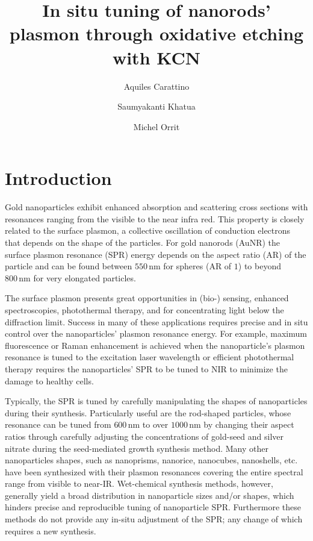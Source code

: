 \documentclass[a4paper,oneside,onecolumn]{article}
\title{In situ tuning of nanorods' plasmon through oxidative etching with KCN}
\author[1]{Aquiles Carattino}
\author[2]{Saumyakanti Khatua}
\author[1]{Michel Orrit}
\affil[1]{Leiden Institute of Physics, Leiden, The Netherlands}
\affil[2]{Indian Institute of Technology- Gandhinagar, Ahmedabad,  India}
\newcommand{\nm}{\ensuremath{\,\textrm{nm}}}
\begin{document}
\maketitle
{}

\section{Introduction}

Gold nanoparticles exhibit enhanced absorption and scattering cross sections
with resonances ranging from the visible to the near infra red. This property is
closely related to the surface plasmon, a collective oscillation of conduction
electrons that depends on the shape of the particles. For gold nanorods (AuNR)
the surface plasmon resonance (SPR) energy depends on the aspect ratio (AR) of
the particle and can be found between $550\nm$ for spheres (AR of $1$) to beyond
$800\nm$ for very elongated particles.

The surface plasmon presents great opportunities in (bio-)
sensing\cite{Zijlstra2012}, enhanced spectroscopies\cite{Sivapalan2013},
photothermal therapy\cite{Zhao2014}, and for concentrating light below the
diffraction limit\cite{Zijlstra2011}. Success in many of these applications
requires precise and in situ control over the nanoparticles' plasmon resonance
energy. For example, maximum fluorescence\cite{Khatua2014} or Raman
enhancement\cite{McFarland2005} is achieved when the nanoparticle's plasmon
resonance is tuned to the excitation laser wavelength or efficient photothermal
therapy requires the nanoparticles' SPR to be tuned to NIR to minimize the
damage to healthy cells\cite{Alkilany2012}.

Typically, the SPR is tuned by carefully manipulating the shapes of
nanoparticles during their synthesis. Particularly useful are the rod-shaped
particles, whose resonance can be tuned from $600\nm$ to over $1000\nm$ by
changing their aspect ratios through carefully adjusting the concentrations of
gold-seed and silver nitrate during the seed-mediated growth synthesis
method\cite{Vigderman2012}. Many other nanoparticles shapes, such as nanoprisms,
nanorice, nanocubes, nanoshells, etc. have been synthesized with their plasmon
resonances covering the entire spectral range from visible to
near-IR\cite{West2003}.
Wet-chemical synthesis methods, however, generally yield a broad distribution in
nanoparticle sizes and/or shapes, which hinders precise and reproducible tuning
of nanoparticle SPR. Furthermore these methods do not provide any in-situ
adjustment of the SPR; any change of which requires a new synthesis.
\end{document}
